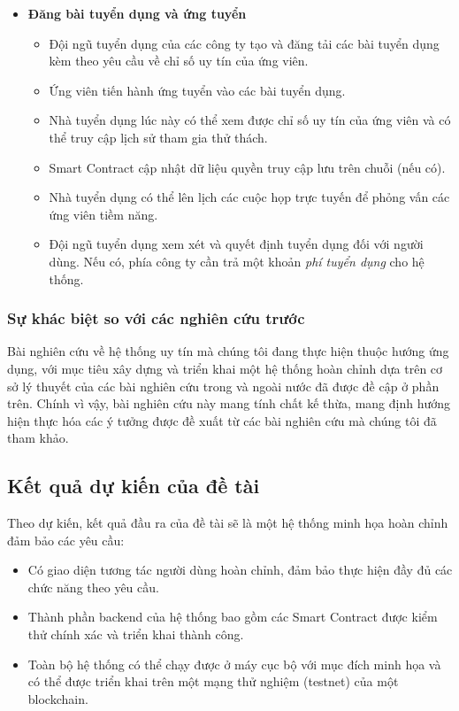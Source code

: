 \documentclass{article}[14pt]
\begin{document}
{\begin{enumerate}[label=\textbf{\alph*.}]
\begin{itemize}
                \item \textbf{Đăng bài tuyển dụng và ứng tuyển}
                      \begin{itemize}
                          \item Đội ngũ tuyển dụng của các công ty tạo và đăng tải các bài tuyển dụng kèm theo yêu cầu về chỉ số uy tín của ứng viên.
                          \item Ứng viên tiến hành ứng tuyển vào các bài tuyển dụng.
                          \item Nhà tuyển dụng lúc này có thể xem được chỉ số uy tín của ứng viên và có thể truy cập lịch sử tham gia thử thách.
                          \item Smart Contract cập nhật dữ liệu quyền truy cập lưu trên chuỗi (nếu có).
                          \item Nhà tuyển dụng có thể lên lịch các cuộc họp trực tuyến để phỏng vấn các ứng viên tiềm năng.
                          \item Đội ngũ tuyển dụng xem xét và quyết định tuyển dụng đối với người dùng. Nếu có, phía công ty cần trả một khoản \textit{phí tuyển dụng} cho hệ thống.
                      \end{itemize}
            \end{itemize}
  \end{enumerate}

  \subsubsection{Sự khác biệt so với các nghiên cứu trước}
  Bài nghiên cứu về hệ thống uy tín mà chúng tôi đang thực hiện thuộc hướng ứng dụng, với mục tiêu xây dựng và triển khai một hệ thống hoàn chỉnh dựa trên cơ sở lý thuyết của các bài nghiên cứu trong và ngoài nước đã được đề cập ở phần trên. Chính vì vậy, bài nghiên cứu này mang tính chất kế thừa, mang định hướng hiện thực hóa các ý tưởng được đề xuất từ các bài nghiên cứu mà chúng tôi đã tham khảo.

  \subsection{Kết quả dự kiến của đề tài}
  Theo dự kiến, kết quả đầu ra của đề tài sẽ là một hệ thống minh họa hoàn chỉnh đảm bảo các yêu cầu:
  \begin{itemize}
      \item Có giao diện tương tác người dùng hoàn chỉnh, đảm bảo thực hiện đầy đủ các chức năng theo yêu cầu.
      \item Thành phần backend của hệ thống bao gồm các Smart Contract được kiểm thử chính xác và triển khai thành công.
      \item Toàn bộ hệ thống có thể chạy được ở máy cục bộ với mục đích minh họa và có thể được triển khai trên một mạng thử nghiệm (testnet) của một blockchain.
  \end{itemize}

}
\end{document}
